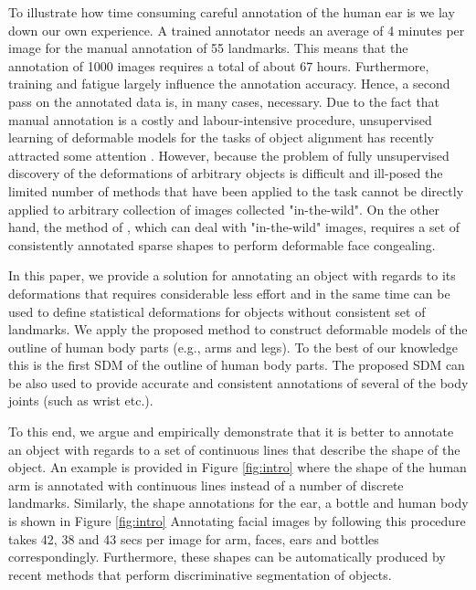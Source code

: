 To illustrate how time consuming careful annotation of the human ear is we lay down our own experience. A trained annotator needs an average of 4 minutes per image for the manual annotation of 55 landmarks. This means that the annotation of 1000 images requires a total of about 67 hours. Furthermore,  training and fatigue largely influence the annotation accuracy. Hence, a second pass on the annotated data is, in many cases, necessary. Due to the fact that manual annotation is a costly and labour-intensive procedure, unsupervised learning of deformable models for the tasks of object alignment has recently attracted some attention \cite{frey2003learning, baker2004automatic, cootes2004groupwise, jojic2006escaping, Huang2006, kokkinos2007unsupervised, jiang2009learning, liu2009simultaneous, Zhang2012}. However, because the problem of fully unsupervised discovery of the deformations of arbitrary objects is difficult and ill-posed the limited number of methods that have been applied to the task cannot be directly applied to arbitrary collection of images collected "in-the-wild". On the other hand, the method of \cite{antonakos2014automatic}, which can deal with "in-the-wild" images, requires a set of consistently annotated sparse shapes to perform deformable face congealing.


In this paper, we provide a solution for annotating an object with regards to its deformations that requires considerable less effort and in the same time can be used to define statistical deformations for objects without consistent set of landmarks. We apply the proposed method to construct deformable models of the outline of  human body parts (e.g., arms and legs). To the best of our knowledge this is the first SDM of the outline of human body parts. The proposed SDM can be also used to provide accurate and consistent annotations of several of the body joints (such as wrist etc.). 

To this end, we argue and empirically demonstrate that it is better to annotate an object with regards to a set of continuous lines that describe the shape of the object. An example is provided in Figure \ref{fig:intro} where the shape of the human arm is annotated with continuous lines instead of a number of discrete landmarks. Similarly, the shape annotations for the ear, a bottle and human body is shown in Figure \ref{fig:intro} Annotating facial images by following this procedure takes 42, 38 and 43 secs per image for arm, faces, ears and bottles correspondingly. Furthermore, these shapes can be automatically produced by recent methods that perform discriminative segmentation of objects.

